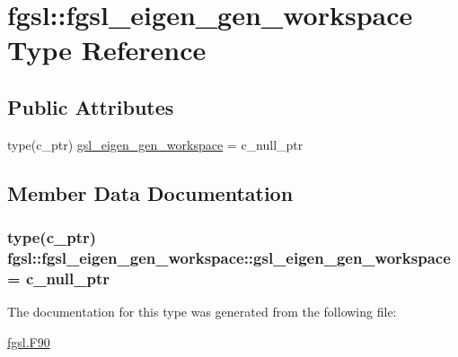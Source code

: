 \hypertarget{structfgsl_1_1fgsl__eigen__gen__workspace}{}\section{fgsl\+:\+:fgsl\+\_\+eigen\+\_\+gen\+\_\+workspace Type Reference}
\label{structfgsl_1_1fgsl__eigen__gen__workspace}
\subsection*{Public Attributes}
\begin{DoxyCompactItemize}
\item 
type(c\+\_\+ptr) \hyperlink{structfgsl_1_1fgsl__eigen__gen__workspace_aa6b6ff281fc9afaf2b7caeeb4ba444fc}{gsl\+\_\+eigen\+\_\+gen\+\_\+workspace} = c\+\_\+null\+\_\+ptr
\end{DoxyCompactItemize}


\subsection{Member Data Documentation}
\hypertarget{structfgsl_1_1fgsl__eigen__gen__workspace_aa6b6ff281fc9afaf2b7caeeb4ba444fc}{}
\subsubsection[{gsl\+\_\+eigen\+\_\+gen\+\_\+workspace}]{\setlength{\rightskip}{0pt plus 5cm}type(c\+\_\+ptr) fgsl\+::fgsl\+\_\+eigen\+\_\+gen\+\_\+workspace\+::gsl\+\_\+eigen\+\_\+gen\+\_\+workspace = c\+\_\+null\+\_\+ptr}\label{structfgsl_1_1fgsl__eigen__gen__workspace_aa6b6ff281fc9afaf2b7caeeb4ba444fc}


The documentation for this type was generated from the following file\+:\begin{DoxyCompactItemize}
\item 
\hyperlink{fgsl_8F90}{fgsl.\+F90}\end{DoxyCompactItemize}
